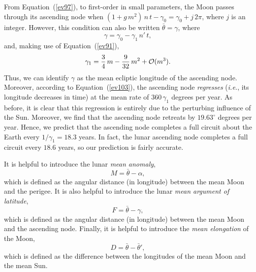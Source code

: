  From Equation~(\ref{ev97}), to first-order in small parameters, the Moon passes through its ascending node  when $(1+g\,m^2)\,n\,t -\gamma_0=\gamma_0+j\,2\pi$, where
 $j$ is an integer. 
 However, this condition can also be written $\bar{\theta}=\gamma$, where
 \begin{equation}\label{ev103}
 \gamma = \gamma_0 - \gamma_1\,n'\,t,
 \end{equation}
 and, making use of Equation~(\ref{ev91}), 
 \begin{equation}
  \gamma_1 = \frac{3}{4}\,m - \frac{9}{32}\,m^2 + {\cal O}(m^3).
  \end{equation}
  Thus, we can identify $\gamma$ as the mean ecliptic longitude of the ascending node. Moreover, according to Equation~(\ref{ev103}),
   the  ascending node {\em regresses}\/  ({\em i.e.},  its longitude decreases  in time) at the mean rate
  of  $360\,\gamma_1$ degrees per year.  As before,  it is clear that this regression is entirely due to the perturbing influence of the Sun.  Moreover, we   find that the ascending node retreats by
  $19.63^\circ$ degrees per year. Hence, we predict that the ascending node completes a full circuit about the Earth every $1/\gamma_1=18.3$ years.
  In fact, the lunar ascending node completes a full circuit every $18.6$ years, so our prediction is fairly accurate. 
  
  
  It is  helpful to introduce the lunar {\em mean anomaly}, 
  \begin{equation}
  M = \bar{\theta} - \alpha,
  \end{equation}
  which is defined as the  angular distance (in longitude) between the mean Moon and the perigee.
  It is also helpful to introduce the lunar {\em mean argument of latitude}, 
  \begin{equation}
  F = \bar{\theta}-\gamma,
  \end{equation}
  which is
  defined as the angular distance (in longitude) between the mean Moon and the ascending node.
   Finally, it is helpful to introduce the {\em mean elongation}\/ of the Moon,
 \begin{equation}
 D = \bar{\theta}-\bar{\theta}',
 \end{equation}
 which is defined as the difference between the longitudes of the mean Moon and the mean Sun.
  
